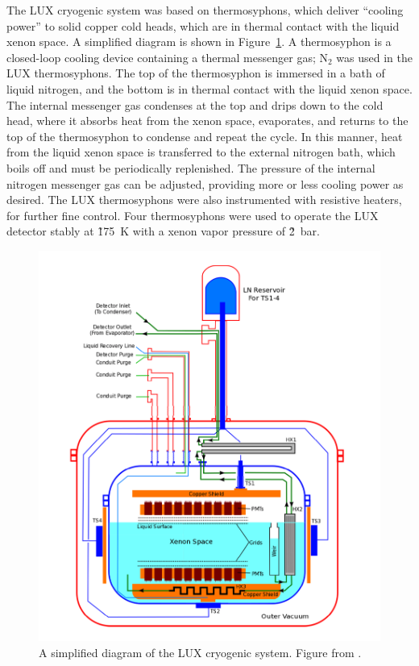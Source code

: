 The \ac{LUX} cryogenic system was based on thermosyphons, which deliver ``cooling power'' to solid copper cold heads, which are in thermal contact with the liquid xenon space. A simplified diagram is shown in Figure~\ref{fig:luxcryo}. A thermosyphon is a closed-loop cooling device containing a thermal messenger gas; N$_{2}$ was used in the \ac{LUX} thermosyphons. The top of the thermosyphon is immersed in a bath of liquid nitrogen, and the bottom is in thermal contact with the liquid xenon space. The internal messenger gas condenses at the top and drips down to the cold head, where it absorbs heat from the xenon space, evaporates, and returns to the top of the thermosyphon to condense and repeat the cycle. In this manner, heat from the liquid xenon space is transferred to the external nitrogen bath, which boils off and must be periodically replenished. The pressure of the internal nitrogen messenger gas can be adjusted, providing more or less cooling power as desired. The \ac{LUX} thermosyphons were also instrumented with resistive heaters, for further fine control. Four thermosyphons were used to operate the \ac{LUX} detector stably at \~175~K with a xenon vapor pressure of \~2~bar. 

\begin{figure}[htbp]
\begin{center}
\includegraphics[width=\textwidth]{figures/lux/lux_cryostats.png}
\caption{A simplified diagram of the \acs{LUX} cryogenic system. Figure from \cite{Larsen2016}.}
\label{fig:luxcryo}
\end{center}
\end{figure}

